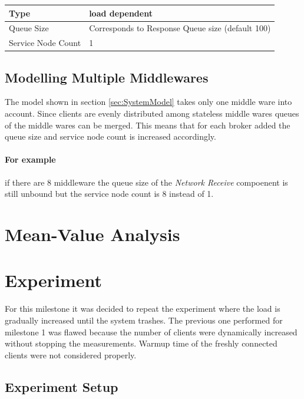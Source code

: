\documentclass[a4paper]{article}
\begin{document}
\begin{tabular}{|l|l|}
\hline 
Type & load dependent \\ 
\hline 
Queue Size & Corresponds to Response Queue size (default 100)\\ 
\hline 
Service Node Count & 1 \\ 
\hline 
\end{tabular} 

\subsection{Modelling Multiple Middlewares}

The model shown in section \ref{sec:SystemModel} takes only one middle ware into account. Since clients are evenly distributed among stateless middle wares queues of the middle wares can be merged. This means that for each broker added the queue size and service node count is increased accordingly.

\paragraph{For example} if there are 8 middleware the queue size of the \textit{Network Receive} compoenent is still unbound but the service node count is 8 instead of 1.


\section{Mean-Value Analysis}

\section{Experiment}
For this milestone it was decided to repeat the experiment where the load is gradually increased until the system trashes. The previous one performed for milestone 1 was flawed because the number of clients were dynamically increased without stopping the measurements. Warmup time of the freshly connected clients were not considered properly.

\subsection{Experiment Setup}
\end{document}
